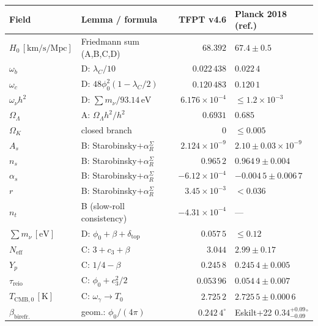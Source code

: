 \documentclass[11pt,a4paper]{article}
\begin{document}
\begin{center}
\renewcommand{\arraystretch}{1.13}
\begin{tabularx}{\textwidth}{@{}p{}p{}rY@{}}
\toprule
\textbf{Field} & \textbf{Lemma / formula} & \textbf{TFPT v4.6} & \textbf{Planck 2018 (ref.)} \\
\midrule
\(H_0\,[\mathrm{km/s/Mpc}]\) & Friedmann sum (A,B,C,D)            & \(68.392\) & \(67.4\pm0.5\) \\
\(\omega_b\)                  & D: \(\lambda_C/10\)                & \(0.022\,438\) & \(0.022\,4\) \\
\(\omega_c\)                  & D: \(48\phi_0^2(1-\lambda_C/2)\)   & \(0.120\,483\) & \(0.120\,1\) \\
\(\omega_\nu h^2\)            & D: \(\sum m_\nu/93.14\,\mathrm{eV}\)& \(6.176\times10^{-4}\) & \(\le 1.2\times10^{-3}\) \\
\(\Omega_\Lambda\)            & A: \(\Omega_\Lambda h^2/h^2\)      & \(0.6931\) & \(0.685\) \\
\(\Omega_K\)                  & closed branch                       & \(0\) & \(\le 0.005\) \\
\(A_s\)                       & B: Starobinsky\(+\alpha_R^\Sigma\) & \(2.124\times10^{-9}\) & \(2.10\pm0.03\times10^{-9}\) \\
\(n_s\)                       & B: Starobinsky\(+\alpha_R^\Sigma\) & \(0.965\,2\) & \(0.964\,9\pm0.004\) \\
\(\alpha_s\)                  & B: Starobinsky\(+\alpha_R^\Sigma\) & \(-6.12\times10^{-4}\) & \(-0.004\,5\pm0.006\,7\) \\
\(r\)                         & B: Starobinsky\(+\alpha_R^\Sigma\) & \(3.45\times10^{-3}\) & \(<0.036\) \\
\(n_t\)                       & B (slow-roll consistency)         & \(-4.31\times10^{-4}\) & --- \\
\(\sum m_\nu\,[\mathrm{eV}]\) & D: \(\phi_0+\beta+\delta_{\mathrm{top}}\) & \(0.057\,5\) & \(\le 0.12\) \\
\(N_{\mathrm{eff}}\)          & C: \(3+c_3+\beta\)                  & \(3.044\) & \(2.99\pm0.17\) \\
\(Y_p\)                       & C: \(1/4 - \beta\)                  & \(0.245\,8\) & \(0.245\,4\pm0.005\) \\
\(\tau_{\mathrm{reio}}\)      & C: \(\phi_0+c_3^2/2\)              & \(0.053\,96\) & \(0.054\,4\pm0.007\) \\
\(T_{\mathrm{CMB},0}\,[\mathrm{K}]\) & C: \(\omega_\gamma\to T_0\) & \(2.725\,2\) & \(2.725\,5\pm0.000\,6\) \\
\(\beta_{\mathrm{birefr.}}\)  & geom.: \(\phi_0/(4\pi)\)            & \(0.242\,4^\circ\) & Eskilt+22 \(0.34^{+0.09}_{-0.09}{}^\circ\) \\
\bottomrule
\end{tabularx}
\end{center}
\end{document}

